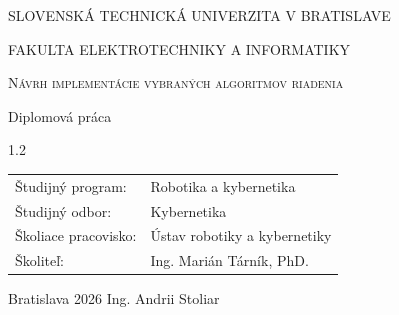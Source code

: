 \documentclass[a4paper, 10pt]{article}
\begin{document}

\thispagestyle{empty}

{%
\Large%
\centerline{\MakeUppercase{Slovenská \hfill technická \hfill univerzita \hfill v \hfill Bratislave}}
\centerline{\MakeUppercase{Fakulta elektrotechniky a informatiky}}
}


\vspace{15mm}

\noindent
{}

\vspace{40mm}


\begin{center}
\scshape%
\fontsize{22pt}{24pt}\selectfont
{%
Návrh implementácie vybraných algoritmov riadenia%
}%
\end{center}

\bigskip

\centerline{\Large{Diplomová práca}}

\vfill

\begin{spacing}{1.2}

\fontsize{11pt}{14pt}\selectfont

\noindent
\begin{tabular}{@{}p{4.0cm} l}
Študijný program: & Robotika a kybernetika\\
Študijný odbor: & Kybernetika \\
Školiace pracovisko: & Ústav robotiky a kybernetiky\\
Školiteľ: & Ing. Marián Tárník, PhD.\\
\end{tabular}
\end{spacing}



\vspace{15mm}

\noindent
{%
\large%
Bratislava 2026 \hfill Ing. Andrii Stoliar%
}




\pagebreak




\end{document}
